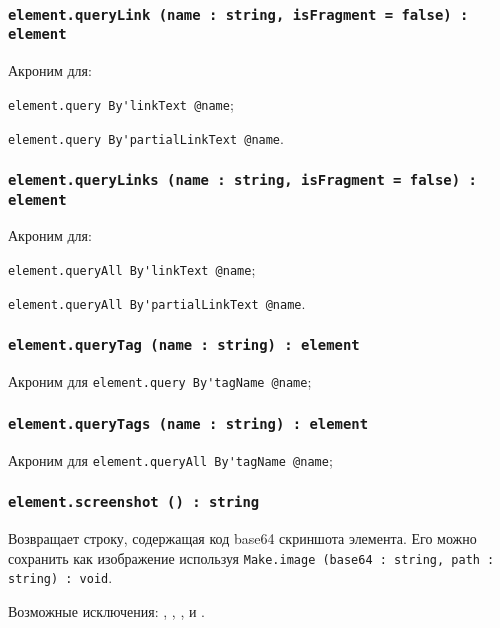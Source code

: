 \subsubsection{\lstinline|element.queryLink (name : string, isFragment = false) : element|}

Акроним для:
\begin{icItems}
	\item \lstinline|element.query By'linkText @name|;
	\item \lstinline|element.query By'partialLinkText @name|.
\end{icItems}

\subsubsection{\lstinline|element.queryLinks (name : string, isFragment = false) : element|}

Акроним для:
\begin{icItems}
	\item \lstinline|element.queryAll By'linkText @name|;
	\item \lstinline|element.queryAll By'partialLinkText @name|.
\end{icItems}

\subsubsection{\lstinline|element.queryTag (name : string) : element|}

Акроним для \lstinline|element.query By'tagName @name|;

\subsubsection{\lstinline|element.queryTags (name : string) : element|}

Акроним для \lstinline|element.queryAll By'tagName @name|;

\subsubsection{\lstinline|element.screenshot () : string|}

Возвращает строку, содержащая код base64 скриншота элемента. Его можно сохранить как изображение используя \lstinline|Make.image (base64 : string, path : string) : void|.

Возможные исключения: , , ,  и .

